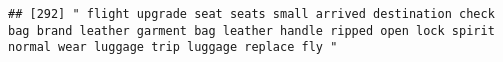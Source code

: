 \documentclass[
]{article}
\begin{document}
\begin{verbatim}
## [292] " flight upgrade seat seats small arrived destination check bag brand leather garment bag leather handle ripped open lock spirit normal wear luggage trip luggage replace fly "                                                                                                                                                                                                                                                                                                                                                                                                                                                                                                                                                                                                                                                                                                                                                                                                                                                                                                                                                                                                                                                                                                                                                                                                                                                                                                                                                                                                                                                                                                                                                                                                                 

\end{verbatim}
\end{document}
